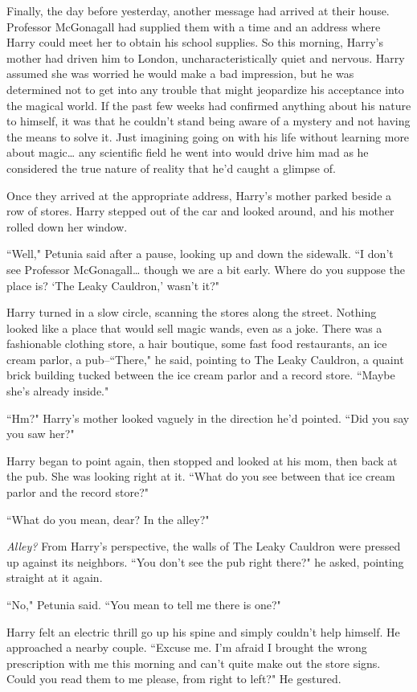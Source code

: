 Finally, the day before yesterday, another message had arrived at their house. Professor McGonagall had supplied them with a time and an address where Harry could meet her to obtain his school supplies. So this morning, Harry's mother had driven him to London, uncharacteristically quiet and nervous. Harry assumed she was worried he would make a bad impression, but he was determined not to get into any trouble that might jeopardize his acceptance into the magical world. If the past few weeks had confirmed anything about his nature to himself, it was that he couldn't stand being aware of a mystery and not having the means to solve it. Just imagining going on with his life without learning more about magic{\ldots} any scientific field he went into would drive him mad as he considered the true nature of reality that he'd caught a glimpse of.

Once they arrived at the appropriate address, Harry's mother parked beside a row of stores. Harry stepped out of the car and looked around, and his mother rolled down her window.

``Well," Petunia said after a pause, looking up and down the sidewalk. ``I don't see Professor McGonagall{\ldots} though we are a bit early. Where do you suppose the place is? `The Leaky Cauldron,' wasn't it?"

Harry turned in a slow circle, scanning the stores along the street. Nothing looked like a place that would sell magic wands, even as a joke. There was a fashionable clothing store, a hair boutique, some fast food restaurants, an ice cream parlor, a pub\---``There," he said, pointing to The Leaky Cauldron, a quaint brick building tucked between the ice cream parlor and a record store. ``Maybe she's already inside."

``Hm?" Harry's mother looked vaguely in the direction he'd pointed. ``Did you say you saw her?"

Harry began to point again, then stopped and looked at his mom, then back at the pub. She was looking right at it. ``What do you see between that ice cream parlor and the record store?"

``What do you mean, dear? In the alley?"

\emph{Alley?} From Harry's perspective, the walls of The Leaky Cauldron were pressed up against its neighbors. ``You don't see the pub right there?" he asked, pointing straight at it again.

``No," Petunia said. ``You mean to tell me there is one?"

Harry felt an electric thrill go up his spine and simply couldn't help himself. He approached a nearby couple. ``Excuse me. I'm afraid I brought the wrong prescription with me this morning and can't quite make out the store signs. Could you read them to me please, from right to left?" He gestured.


